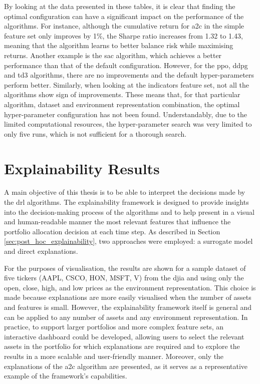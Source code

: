 


By looking at the data presented in these tables, it is clear that finding the optimal configuration can have a significant impact on the performance of the algorithms. For instance, although the cumulative return for \acrshort{a2c} in the simple feature set only improves by 1\%, the Sharpe ratio increases from 1.32 to 1.43, meaning that the algorithm learns to better balance risk while maximising returns. Another example is the \acrshort{sac} algorithm, which achieves a better performance than that of the default configuration. However, for the \acrshort{ppo}, \acrshort{ddpg} and \acrshort{td3} algorithms, there are no improvements and the default hyper-parameters perform better. Similarly, when looking at the indicators feature set, not all the algorithms show sign of improvements. These means that, for that particular algorithm, dataset and environment representation combination, the optimal hyper-parameter configuration has not been found. Understandably, due to the limited computational resources, the hyper-parameter search was very limited to only five runs, which is not sufficient for a thorough search.

\section{Explainability Results} \label{sec:explainability-framework}

A main objective of this thesis is to be able to interpret the decisions made by the \acrshort{drl} algorithms. The explainability framework is designed to provide insights into the decision-making process of the algorithms and to help present in a visual and human-readable manner the most relevant features that influence the portfolio allocation decision at each time step. As described in Section \ref{sec:post_hoc_explainability}, two approaches were employed: a surrogate model and direct explanations. 

For the purposes of visualisation, the results are shown for a sample dataset of five tickers (AAPL, CSCO, HON, MSFT, V) from the \acrshort{djia} and using only the open, close, high, and low prices as the environment representation. This choice is made because explanations are more easily visualised when the number of assets and features is small. However, the explainability framework itself is general and can be applied to any number of assets and any environment representation. In practice, to support larger portfolios and more complex feature sets, an interactive dashboard could be developed, allowing users to select the relevant assets in the portfolio for which explanations are required and to explore the results in a more scalable and user-friendly manner. Moreover, only the explanations of the \acrshort{a2c} algorithm are presented, as it serves as a representative example of the framework's capabilities.

